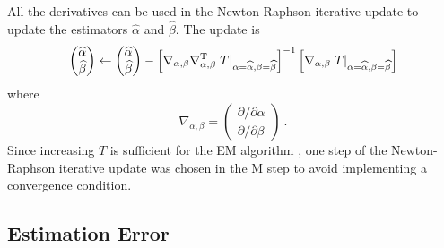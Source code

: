 All the derivatives can be used in the Newton-Raphson iterative update to update the estimators $\widehat{\alpha}$ and $\widehat{\beta}$. The update is
\begin{equation}
  \begin{pmatrix}
    \widehat{\alpha} \\ \widehat{\beta}
  \end{pmatrix}
  \leftarrow
  \begin{pmatrix}
    \widehat{\alpha} \\ \widehat{\beta}
  \end{pmatrix}
  -
  \left[
    \nabla_{\alpha,\beta}\nabla_{\alpha,\beta}^\textup{T} \left. T \right |_{\alpha = \widehat{\alpha}, \beta=\widehat{\beta}}
  \right]^{-1}
  \left[
    \nabla_{\alpha,\beta} \left. T \right |_{\alpha = \widehat{\alpha}, \beta=\widehat{\beta}}
  \right]
\end{equation}
where
\begin{equation}
  \nabla_{\alpha,\beta}=
  \begin{pmatrix}
    {\partial}/{\partial \alpha}
    \\
    {\partial}/{\partial \beta}
  \end{pmatrix}
  \ .
\end{equation}
Since increasing $T$ is sufficient for the EM algorithm \citep{dempster1977maximum}, one step of the Newton-Raphson iterative update was chosen in the M step to avoid implementing a convergence condition.

\subsection{Estimation Error}


